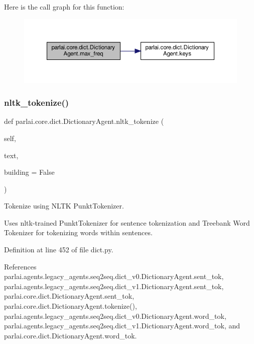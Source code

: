 Here is the call graph for this function\+:
\nopagebreak
\begin{figure}[H]
\begin{center}
\leavevmode
\includegraphics[width=350pt]{classparlai_1_1core_1_1dict_1_1DictionaryAgent_a3c3ef6181e0cea58b2650af763db1d17_cgraph}
\end{center}
\end{figure}
\mbox{\label{classparlai_1_1core_1_1dict_1_1DictionaryAgent_a73fe72e257ace6e8debf2c41995f8390}} 
\subsubsection{\texorpdfstring{nltk\+\_\+tokenize()}{nltk\_tokenize()}}
{\footnotesize\ttfamily def parlai.\+core.\+dict.\+Dictionary\+Agent.\+nltk\+\_\+tokenize (\begin{DoxyParamCaption}\item[{}]{self,  }\item[{}]{text,  }\item[{}]{building = {\ttfamily False} }\end{DoxyParamCaption})}

\begin{DoxyVerb}Tokenize using NLTK PunktTokenizer.

Uses nltk-trained PunktTokenizer for sentence tokenization and
Treebank Word Tokenizer for tokenizing words within sentences.
\end{DoxyVerb}
 

Definition at line 452 of file dict.\+py.



References parlai.\+agents.\+legacy\+\_\+agents.\+seq2seq.\+dict\+\_\+v0.\+Dictionary\+Agent.\+sent\+\_\+tok, parlai.\+agents.\+legacy\+\_\+agents.\+seq2seq.\+dict\+\_\+v1.\+Dictionary\+Agent.\+sent\+\_\+tok, parlai.\+core.\+dict.\+Dictionary\+Agent.\+sent\+\_\+tok, parlai.\+core.\+dict.\+Dictionary\+Agent.\+tokenize(), parlai.\+agents.\+legacy\+\_\+agents.\+seq2seq.\+dict\+\_\+v0.\+Dictionary\+Agent.\+word\+\_\+tok, parlai.\+agents.\+legacy\+\_\+agents.\+seq2seq.\+dict\+\_\+v1.\+Dictionary\+Agent.\+word\+\_\+tok, and parlai.\+core.\+dict.\+Dictionary\+Agent.\+word\+\_\+tok.

